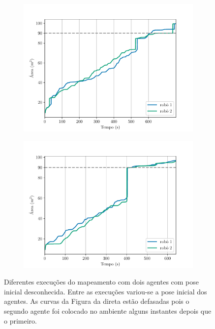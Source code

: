 \begin{figure}
  \centering
  \begin{subfigure}{0.49\textwidth}
    \includegraphics[width=\textwidth]{figs/area_coverage_two_robots-with-unknown-positions-01.pdf}
    \caption{}
    \label{fig:unk-pose-area-coverage-first}
  \end{subfigure}
  \hfill
  \begin{subfigure}{0.49\textwidth}
    \includegraphics[width=\textwidth]{figs/area_coverage_two_robots-with-unknown-positions-02.pdf}
    \caption{}
    \label{fig:}
  \end{subfigure}
  \caption[Comparação da evolução das áreas cobertas por dois agentes com pose inicial desconhecida]{Diferentes execuções do mapeamento com dois agentes com pose inicial desconhecida. Entre as execuções variou-se a pose inicial dos 
  agentes. As curvas da Figura da direta estão defasadas pois o segundo 
  agente foi colocado no ambiente alguns instantes depois que o primeiro.}
  \label{fig:unknown-initial-pose-area-coverage}
\end{figure}

